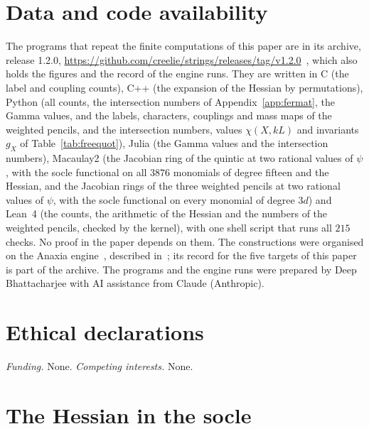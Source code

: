 \documentclass[11pt]{amsart}
\theoremstyle{definition}
\theoremstyle{remark}
\begin{document}
\section*{Data and code availability}

The programs that repeat the finite computations of this paper are in its
archive, release 1.2.0,
\url{https://github.com/creelie/strings/releases/tag/v1.2.0}~\cite{Repo},
which also holds the figures and the record of the engine runs. They are
written in C (the label and coupling counts), C++ (the expansion of the
Hessian by permutations), Python (all counts, the intersection numbers of
Appendix~\ref{app:fermat}, the Gamma values, and the labels, characters,
couplings and mass maps of the weighted pencils, and the intersection numbers,
values $\chi(X,kL)$ and invariants $g_X$ of Table~\ref{tab:freequot}), Julia (the Gamma values
and the intersection numbers), Macaulay2 (the Jacobian ring of the quintic
at two rational values of $\psi$, with the socle functional on all $3876$
monomials of degree fifteen and the Hessian, and the Jacobian rings of the
three weighted pencils at two rational values of $\psi$, with the socle
functional on every monomial of degree $3d$) and Lean~4 (the counts, the
arithmetic of the Hessian and the numbers of the weighted pencils, checked
by the kernel), with one shell script that runs all $215$ checks. No proof
in the paper depends on them. The constructions were organised on the
Anaxia engine~\cite{Ana26}, described in~\cite{BB26}; its
record for the five targets of this paper is part of the archive. The programs and the engine
runs were prepared by Deep Bhattacharjee with AI assistance from Claude
(Anthropic).

\section*{Ethical declarations}

\emph{Funding.} None. \emph{Competing interests.} None.

\appendix

\section{The Hessian in the socle}\label{app:hessian}
\end{document}
